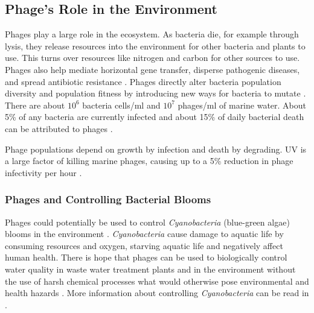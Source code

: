 \subsection{Phage's Role in the Environment}
Phages play a large role in the ecosystem. 
As bacteria die, for example through lysis, they release resources into the environment for other bacteria and plants to use. 
This turns over resources like nitrogen and carbon for other sources to use. 
Phages also help mediate horizontal gene transfer, disperse pathogenic diseases, and spread antibiotic resistance \cite{al-shayebCladesHugePhages2020}. 
Phages directly alter bacteria population diversity and population fitness by introducing new ways for bacteria to mutate \cite{brownEcologicalFunctionalRoles2022}. 
There are about $10^6$ bacteria cells/ml and $10^7$ phages/ml of marine water. 
About 5\% of any bacteria are currently infected and about 15\% of daily bacterial death can be attributed to phages \cite{chibani-chennoufiPhageHostInteractionEcological2004}. 


Phage populations depend on growth by infection and death by degrading. 
UV is a large factor of killing marine phages, causing up to a 5\% reduction in phage infectivity per hour \cite{chibani-chennoufiPhageHostInteractionEcological2004}. 

\subsubsection{Phages and Controlling Bacterial Blooms}
Phages could potentially be used to control \textit{Cyanobacteria} (blue-green algae) blooms in the environment \cite{colomaFrequencyVirusresistantHosts2019}. 
\textit{Cyanobacteria} cause damage to aquatic life by consuming resources and oxygen, starving aquatic life and negatively affect human health. 
There is hope that phages can be used to biologically control water quality in waste water treatment plants and in the environment without the use of harsh chemical processes what would otherwise pose environmental and health hazards \cite{krysiak-baltynSimulationPhageDynamics2017, tuckerIdentificationCyanophageMaLBP2005}. 
More information about controlling \textit{Cyanobacteria} can be read in . 

